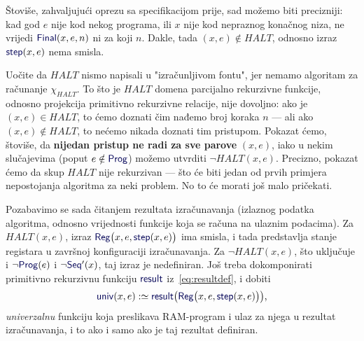\begin{napomena}[{name=[totalna specifikacija zaustavljanja izračunavanja]}]\label{nap:HaltProg}
Štoviše, zahvaljujući oprezu sa specifikacijom prije, sad možemo biti precizniji: kad god $e$ nije kod nekog programa, ili $x$ nije kod nepraznog konačnog niza, ne vrijedi $\f{Final}(x,e,n)$ ni za koji $n$. Dakle, tada $(x,e)\notin HALT$, odnosno izraz $\f{step}(x,e)$ nema smisla.
\end{napomena}

Uočite da $HALT$ nismo napisali u "izračunljivom fontu", jer nemamo algoritam za računanje $\chi_{HALT}$. To što je $HALT$ domena parcijalno rekurzivne funkcije, odnosno projekcija primitivno rekurzivne relacije, nije dovoljno: ako je $(x,e)\in HALT$, to ćemo doznati čim nađemo broj koraka $n$ --- ali ako $(x,e)\notin HALT$, to nećemo nikada doznati tim pristupom. Pokazat ćemo, štoviše, da \textbf{nijedan pristup ne radi za sve parove} $(x,e)$, iako u nekim slučajevima (poput $e\notin\f{Prog}$) možemo utvrditi $\lnot HALT(x,e)$. Precizno, pokazat ćemo da skup $HALT$ nije rekurzivan --- što će biti jedan od prvih primjera nepostojanja algoritma za neki problem. No to će morati još malo pričekati.

Pozabavimo se sada čitanjem rezultata izračunavanja (izlaznog podatka algoritma, odnosno vrijednosti funkcije koja se računa na ulaznim podacima). Za $HALT(x,e)$, izraz $\f{Reg}\bigl(x,e,\f{step}(x,e)\bigr)$ ima smisla, i tada predstavlja stanje registara u završnoj konfiguraciji izračunavanja. Za $\lnot HALT(x,e)$, što uključuje i $\lnot\f{Prog}(e)$ i $\lnot\f{Seq}'(x)$, taj izraz je nedefiniran. Još treba dokomponirati primitivno rekurzivnu funkciju $\f{result}$ iz~\eqref{eq:resultdef}, i dobiti
\begin{equation}
\label{eq:univdef}\f{univ}(x,e):\simeq\f{result}\bigl(\f{Reg}\bigl(x,e,\f{step}(x,e)\bigr)\bigr)\text,
\end{equation}
\emph{univerzalnu} funkciju koja preslikava RAM-program i ulaz za njega u rezultat iz\-ra\-ču\-na\-va\-nja, i to ako i samo ako je taj rezultat definiran.

